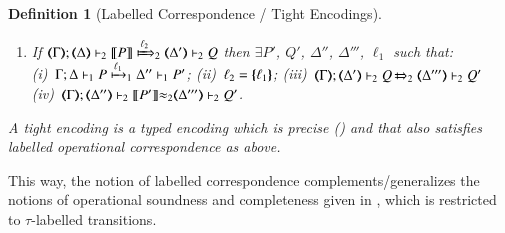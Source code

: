 \documentclass[preprint,11pt]{elsarticle}
\newtheorem{definition}{Definition}[section]
\begin{document}
{{\begin{definition}[Labelled Correspondence / Tight Encodings]
\begin{enumerate}[1.]
			\item
					If		$\wtytraargi{\mapt{\Gamma}}{\ell_2}{\mapt{\Delta}}{\map{P}}{\mapt{\Delta'}}{Q}{2}{2}$
					then	$\exists P'$, $Q'$, $\Delta''$, $\Delta'''$, $\ell_1$ such that: \\ 
							(i)~$\stytraargi{\Gamma}{\ell_1}{\Delta}{P}{\Delta''}{P'}{1}{1}$;
							(ii)~$\ell_2 = \mapa{\ell_1}$;
							(iii)~$\wtytraargi{\mapt{\Gamma}}{}{\mapt{\Delta'}}{Q}{\mapt{\Delta'''}}{Q'}{2}{2}$
							(iv)~${\mapt{\Gamma}};{\mapt{\Delta''}}\proves_2 {\map{P'}}{\wb_2}{\mapt{\Delta'''}}\proves_2 {Q'}$.
	\end{enumerate}
A \emph{tight encoding} is a typed 
encoding 
which is precise () and that also satisfies 
labelled operational correspondence as above.
\end{definition}

This way, 
the notion of labelled correspondence complements/generalizes the notions of operational soundness and completeness 
given in , which is restricted to $\tau$-labelled transitions.


}}
\end{document}
